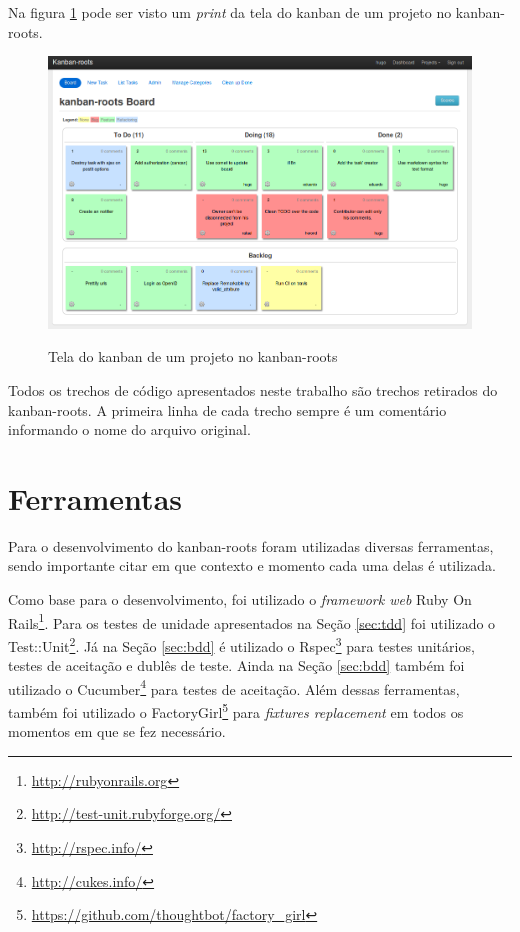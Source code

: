 Na figura \ref{img:tela_kaban_roots} pode ser visto um \textit{print} da tela do kanban de um projeto no kanban-roots.

\begin{figure}[h]
  \center
  \caption{Tela do kanban de um projeto no kanban-roots}
  \includegraphics[scale=0.45]{images/kanban-roots}
  \label{img:tela_kaban_roots}
\end{figure}

Todos os trechos de código apresentados neste trabalho são trechos retirados do kanban-roots. A primeira linha de cada trecho sempre é um comentário informando o nome do arquivo original.

\section{Ferramentas}

Para o desenvolvimento do kanban-roots foram utilizadas diversas ferramentas, sendo importante citar em que contexto e momento cada uma delas é utilizada.

Como base para o desenvolvimento, foi utilizado o \textit{framework web} Ruby On Rails\footnote{\url{http://rubyonrails.org}}. Para os testes de unidade apresentados na Seção \ref{sec:tdd} foi utilizado o Test::Unit\footnote{\url{http://test-unit.rubyforge.org/}}. Já na Seção \ref{sec:bdd} é utilizado o Rspec\footnote{\url{http://rspec.info/}} para testes unitários, testes de aceitação e dublês de teste. Ainda na Seção \ref{sec:bdd} também foi utilizado o Cucumber\footnote{\url{http://cukes.info/}} para testes de aceitação. Além dessas ferramentas, também foi utilizado o FactoryGirl\footnote{\url{https://github.com/thoughtbot/factory_girl}} para \textit{fixtures replacement} em todos os momentos em que se fez necessário.

